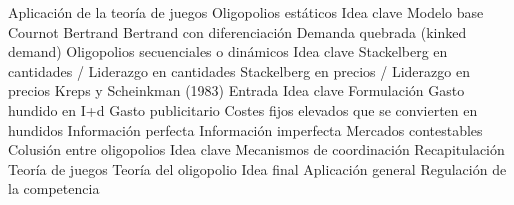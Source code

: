 \documentclass{nuevotema}
\begin{document}
\begin{esquema}[enumerate]
			\3 Aplicación de la teoría de juegos
		\2 Oligopolios estáticos
			\3 Idea clave
			\3 Modelo base
			\3 Cournot
			\3 Bertrand
			\3 Bertrand con diferenciación
			\3 Demanda quebrada (kinked demand)
		\2 Oligopolios secuenciales o dinámicos
			\3 Idea clave
			\3 Stackelberg en cantidades / Liderazgo en cantidades
			\3 Stackelberg en precios / Liderazgo en precios
			\3 Kreps y Scheinkman (1983)
		\2 Entrada
			\3 Idea clave
			\3 Formulación
			\3 Gasto hundido en I+d
			\3 Gasto publicitario
			\3 Costes fijos elevados que se convierten en hundidos
			\3 Información perfecta
			\3 Información imperfecta
			\3 Mercados contestables
		\2 Colusión entre oligopolios
			\3 Idea clave
			\3 Mecanismos de coordinación
	\1[] 
		\2 Recapitulación
			\3 Teoría de juegos
			\3 Teoría del oligopolio
		\2 Idea final
			\3 Aplicación general
			\3 Regulación de la competencia

\end{esquema}

\esquemalargo
\end{document}
